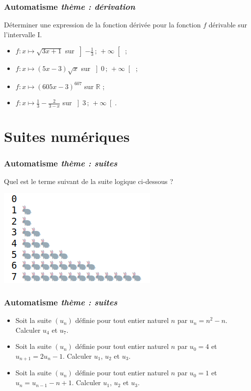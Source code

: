 \documentclass[11pt]{beamer}
\newcommand{\R}{\mathbb{R}}
\newcommand{\Interoo}[2]{\left]#1\, ;\, #2\right[}
\newcommand{\suite}[1]{\ensuremath{\left(#1_{n}\right)}}
\newcounter{autocompteur}
\newcommand{\automatisme}[1]{\addtocounter{autocompteur}{1}\frametitle{Automatisme  \theautocompteur  \textit{ thème : #1}}}
\begin{document}
\begin{frame}
\automatisme{dérivation}

Déterminer une expression de la fonction dérivée pour la fonction $f$ dérivable sur l'intervalle I.
\begin{itemize}
\item $f:x \mapsto \sqrt{3x+1}$ sur $\Interoo{-\frac{1}{3}}{+\infty}$ ;
 \item $f:x \mapsto (5x-3)\sqrt{x}$ sur $\Interoo{0}{+\infty}$ ;
 \item $f:x \mapsto \left(605x-3\right)^{607}$ sur $\R$ ; 
 \item $f:x \mapsto \frac{1}{3}-\frac{2}{3-x}$ sur $\Interoo{3}{+\infty}$.
\end{itemize}

\end{frame}




\section{Suites numériques}

\begin{frame}
\automatisme{suites}

Quel est le  terme suivant de la suite logique ci-dessous ?

\begin{center}
\includegraphics[scale=0.5]{ressources/fibo.png}
\end{center}
\end{frame}

\begin{frame}
\automatisme{suites}


\begin{itemize}
\item Soit la suite $\suite{u}$ définie pour tout entier naturel $n$ par $u_{n}=n^{2}-n$. Calculer $u_{4}$ et $u_{7}$.
 \item Soit la suite $\suite{u}$ définie pour tout entier naturel $n$ par $u_{0}=4$ et $u_{n+1}=2u_{n}-1$. Calculer $u_{1}$, $u_{2}$ et $u_{3}$.
 \item Soit la suite $\suite{u}$ définie pour tout entier naturel $n$ par $u_{0}=1$ et $u_{n}=u_{n-1}-n+1$. Calculer $u_{1}$, $u_{2}$ et $u_{3}$.
\end{itemize}

\end{frame}
\end{document}
